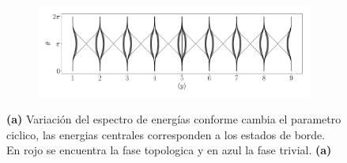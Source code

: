 \begin{figure}[h!]
     \begin{minipage}[h!]{1\textwidth}
        \begin{subfigure}[b!]{0.9 \textwidth}
            \caption{}
            \includegraphics[width=\textwidth]{Imagenes/Resultados_pump_Cuadrado/xy/wannier_centery.pdf}
        \end{subfigure}\hspace*{-0.5em}
    \end{minipage}\vspace*{-1em}
    
    \caption{\textbf{(a)} Variación del espectro de energías conforme cambia el parametro ciclico, las energias centrales corresponden a los estados de borde. En rojo se encuentra la fase topologica y en azul la fase trivial. \textbf{(a)}}
    \label{fig:Pump_cuadrado_xy}
\end{figure}